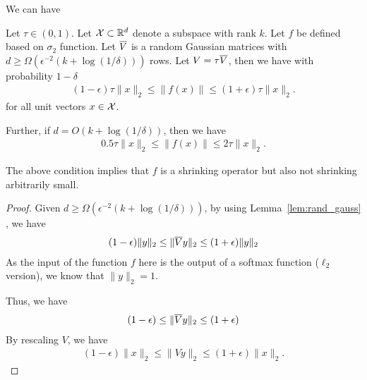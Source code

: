 We can have
\begin{lemma}\label{lem:ell_2_subspace_imply_norm_preserve}
Let $\tau \in (0,1)$. Let ${\cal X} \subset \mathbb{R}^d$ denote a subspace with rank $k$.
Let $f$ be defined based on $\sigma_2$ function. 
Let $\overline{V}$ is a random Gaussian matrices with $d \geq \Omega( \epsilon^{-2} ( k + \log(1/\delta) ))$ rows. Let $V = \tau \overline{V} $, then we have with probability $1-\delta$ 
\begin{align*}
(1-\epsilon) \tau \| x \|_2 \leq \| f(x) \| \leq (1+\epsilon) \tau \| x \|_2.
\end{align*}
for all unit vectors $x \in {\cal X}$.

Further, if $d=  O(k + \log(1/\delta))$, then we have
\begin{align*}
0.5 \tau \| x \|_2 \leq \| f(x) \| \leq 2 \tau \| x \|_2.
\end{align*}
\end{lemma} 
\begin{remark}
The above condition implies that $f$ is a shrinking operator but also not shrinking arbitrarily small.
\end{remark}
\begin{proof}
Given $d \geq \Omega( \epsilon^{-2} ( k + \log(1/\delta) ) )$, by using Lemma~\ref{lem:rand_gauss} 
, we have
\begin{align*}
(1-\epsilon)  \| y \|_2 \leq \| \overline{V} y \|_2 \leq (1+\epsilon)  \| y \|_2
\end{align*}
As the input of the function $f$ here is the output of a softmax function ($\ell_2$ version), we know that $\| y \|_2 = 1$.

Thus, we have
\begin{align*}
(1-\epsilon)  \leq \| \overline{V} y \|_2 \leq (1+\epsilon) 
\end{align*} 
By rescaling $V$, we have
\begin{align*}
(1-\epsilon)  \| x \|_2 \leq \| V y \|_2 \leq (1+\epsilon)   \| x \|_2.
\end{align*} 
\end{proof}


